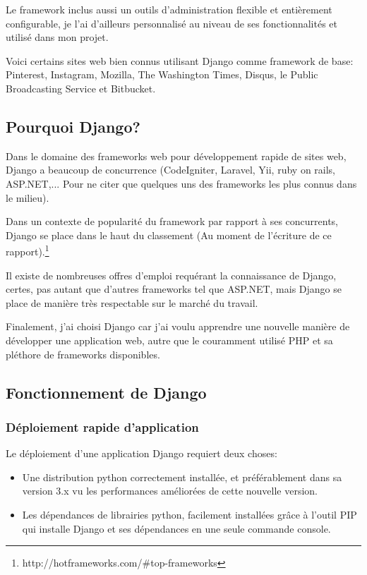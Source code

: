 \documentclass[12pt,table,a4paper]{report}
\begin{document}
Le framework inclus aussi un outils d'administration flexible et entièrement configurable, je l'ai d'ailleurs personnalisé au niveau de ses fonctionnalités et utilisé dans mon projet.

Voici certains sites web bien connus utilisant Django comme framework de base: Pinterest, Instagram, Mozilla, The Washington Times, Disqus, le Public Broadcasting Service et Bitbucket. 

\subsection{Pourquoi Django?}

Dans le domaine des frameworks web pour développement rapide de sites web, Django a beaucoup de concurrence (CodeIgniter, Laravel, Yii, ruby on rails, ASP.NET,... Pour ne citer que quelques uns des frameworks les plus connus dans le milieu).

Dans un contexte de popularité du framework par rapport à ses concurrents, Django se place dans le haut du classement (Au moment de l'écriture de ce rapport).\footnote{http://hotframeworks.com/\#top-frameworks}

Il existe de nombreuses offres d'emploi requérant la connaissance de Django, certes, pas autant que d'autres frameworks tel que ASP.NET, mais Django se place de manière très respectable sur le marché du travail.

Finalement, j'ai choisi Django car j'ai voulu apprendre une nouvelle manière de développer une application web, autre que le couramment utilisé PHP et sa pléthore de frameworks disponibles.

\subsection{Fonctionnement de Django}
\subsubsection{Déploiement rapide d'application}
Le déploiement d'une application Django requiert deux choses:

\begin{itemize}
	\item{Une distribution python correctement installée, et préférablement dans sa version 3.x vu les performances améliorées de cette nouvelle version.}
	\item{Les dépendances de librairies python, facilement installées grâce à l'outil PIP qui installe Django et ses dépendances en une seule commande console.}
\end{itemize}
\end{document}
